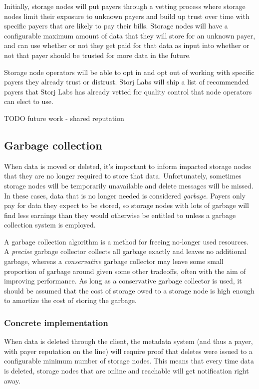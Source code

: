 \documentclass[a4paper,10pt]{article} \usepackage[utf8]{inputenc}
\newcommand{\todo}[1]{{\color{red} TODO #1 }}
\begin{document}
Initially, storage nodes will put payers through a vetting process
where storage nodes limit their exposure to unknown payers and build up trust
over time with specific payers that are likely to pay their bills. 
Storage nodes
will have a configurable maximum amount of data that they will store for an
unknown payer, and can use whether or not they get paid for that data 
as input into
whether or not that payer should be trusted for more data in the future.

Storage node operators will be able to opt in and opt out of working 
with specific payers they already 
trust or distrust. 
Storj Labs will ship a list of recommended payers that
Storj Labs has already vetted for quality control that
node operators can elect to use.

\todo{future work - shared reputation}

\subsection{Garbage collection}

When data is moved or deleted, it's important to inform impacted storage nodes
that they are no longer required to store that data. Unfortunately, sometimes
storage nodes will be temporarily unavailable and delete messages will be
missed. In these cases, data that is no longer needed is considered
{\em garbage}. Payers only pay for data they expect to be stored, so storage
nodes with lots of garbage will find less earnings than they would
otherwise be entitled to unless a garbage collection system is employed.

A garbage collection algorithm is a method for freeing no-longer used resources.
A {\em precise} garbage collector collects all garbage exactly and
leaves no additional garbage, whereas a {\em conservative} garbage collector may
leave some small proportion of garbage around given some other tradeoffs, 
often with the aim of improving performance. 
As long as a conservative garbage collector is used, it should
be assumed that the cost of storage owed to a storage node is high enough
to amortize the cost of storing the garbage.

\subsubsection{Concrete implementation}

When data is deleted through the client, the metadata system (and thus a payer,
with payer reputation on the line) will require proof that deletes were issued
to a configurable minimum number of storage nodes. This means that every time
data is deleted, storage nodes that are online and reachable will get
notification right away.
\end{document}
